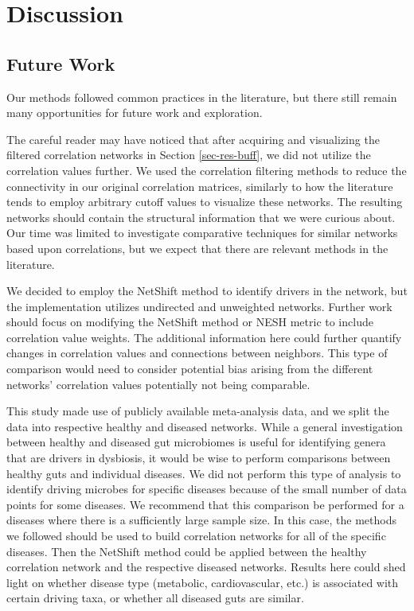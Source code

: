 
\chapter{Discussion}

\bigskip



\section{Future Work}
 Our methods followed common practices in the literature, but there still remain many opportunities for future work and exploration. 
 
 The careful reader may have noticed that after acquiring and visualizing the filtered correlation networks in Section \ref{sec-res-buff}, we did not utilize the correlation values further. We used the correlation filtering methods to reduce the connectivity in our original correlation matrices, similarly to how the literature tends to employ arbitrary cutoff values to visualize these networks. The resulting networks should contain the structural information that we were curious about. Our time was limited to investigate comparative techniques for similar networks based upon correlations, but we expect that there are relevant methods in the literature.
 
 We decided to employ the NetShift method to identify drivers in the network, but the \citet{Kuntal2018} implementation utilizes undirected and unweighted networks. Further work should focus on modifying the NetShift method or \acrshort{NESH} metric to include correlation value weights. The additional information here could further quantify changes in correlation values and connections between neighbors. This type of comparison would need to consider potential bias arising from the different networks' correlation values potentially not being comparable. 
 
 This study made use of publicly available meta-analysis data, and we split the data into respective healthy and diseased networks. While a general investigation between healthy and diseased gut microbiomes is useful for identifying genera that are drivers in dysbiosis, it would be wise to perform comparisons between healthy guts and individual diseases. We did not perform this type of analysis to identify driving microbes for specific diseases because of the small number of data points for some diseases. We recommend that this comparison be performed for a diseases where there is a sufficiently large sample size. In this case, the methods we followed should be used to build correlation networks for all of the specific diseases. Then the NetShift method could be applied between the healthy correlation network and the respective diseased networks. Results here could shed light on whether disease type (metabolic, cardiovascular, etc.) is associated with certain driving taxa, or whether all diseased guts are similar. 
 
